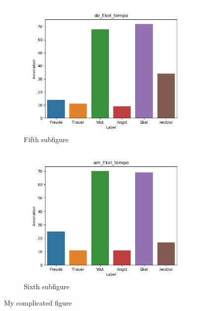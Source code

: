 \documentclass[11pt,a4paper,headsepline,twoside,toc=bibliography]{scrreprt}
\begin{document}
\begin{figure}[t!]
	\medskip
	\begin{subfigure}{0.48\textwidth}
		\includegraphics[width=\linewidth]{plots/de_Ekel_tempo.png}
		\caption{Fifth subfigure} \label{fig:de_E_tempo}
	\end{subfigure}\hspace*{\fill}
	\begin{subfigure}{0.48\textwidth}
		\includegraphics[width=\linewidth]{plots/am_Ekel_tempo.png}
		\caption{Sixth subfigure} \label{fig:am__E_tempo}
	\end{subfigure}
	
	\caption{My complicated figure} \label{fig:countplots_E}
\end{figure}
\end{document}
